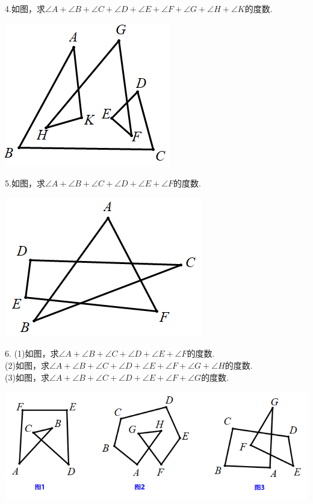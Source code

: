 4.如图，求$\angle A+\angle B+\angle C+\angle D+\angle E+\angle F+\angle G+\angle H+\angle K$的度数.

 \includegraphics[scale=0.5]{figure/bazhi12.PNG}
 
5.如图，求$\angle A+\angle B+\angle C+\angle D+\angle E+\angle F$的度数.

 \includegraphics[scale=0.5]{figure/bazhi15.PNG}
 
6. (1)如图，求$\angle A+\angle B+\angle C+\angle D+\angle E+\angle F$的度数.\\
    (2)如图，求$\angle A+\angle B+\angle C+\angle D+\angle E+\angle F+\angle G+\angle H$的度数.\\
    (3)如图，求$\angle A+\angle B+\angle C+\angle D+\angle E+\angle F+\angle G$的度数.
    
 \includegraphics[scale=0.5]{figure/bazhi13.PNG}
 
